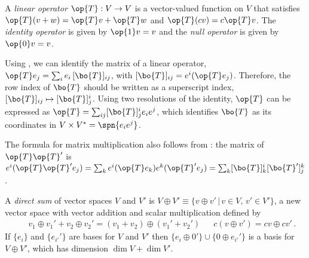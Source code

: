 \documentclass[11pt,fleqn]{article}
\numberwithin{equation}{section}
\begin{document}
\begin{dfn}
A \textit{linear operator} $\op{T}:V\rightarrow V$ is a vector-valued function on $V$ that satisfies $\op{T}(v+w)=\op{T}v + \op{T}w$ and $\op{T}(cv)=c\op{T}v$.
The \textit{identity operator} is given by $\op{1}v=v$ and the \textit{null operator} is given by $\op{0}v=v$.
\end{dfn}

\begin{prop}\label{resolution-of-the-identity}
\end{prop}

\begin{rmk}
Using , we can identify the matrix of a linear operator, $\op{T}e_j=\sum_ie_i\,[\bo{T}]_{ij}$, with $[\bo{T}]_{ij}=e^i(\op{T}e_j)$.
Therefore, the row index of $\bo{T}$ should be written as a superscript index, $[\bo{T}]_{ij}\mapsto[\bo{T}]^i_j$.
Using two resolutions of the identity, $\op{T}$ can be expressed as $\op{T}=\sum_{ij}[\bo{T}]_j^ie_ie^j$, which identifies $\bo{T}$ as its coordinates in $V\times V^*=\spn\{e_ie^j\}$.
\end{rmk}

\begin{rmk}
The formula for matrix multiplication also follows from :
the matrix of $\op{T}\op{T}'$ is $e^i(\op{T}\op{T}'e_j)=\sum_ke^i(\op{T}e_k)e^k(\op{T}'e_j)=\sum_k[\bo{T}]^i_k[\bo{T}']^k_j$.
\end{rmk}

\begin{dfn}\label{direct-sum-v-oplus-v'}
A \textit{direct sum} of vector spaces $V$ and $V'$ is $V\oplus V'\equiv\{v\oplus v'\,|\,v\in V,\,v'\in V'\}$, a new vector space with vector addition and scalar multiplication defined by
\begin{align}
&&
  v_1\oplus v_1'
+
  v_2\oplus v_2'
=
  (v_1 + v_2)
\oplus
  (v_1' + v_2')
&&
  c(v\oplus v')
=
  cv\oplus cv'\,.
\end{align}
If $\{e_i\}$ and $\{e_{i'}'\}$ are bases for $V$ and $V'$ then $\{e_i\oplus0'\}\cup\{0\oplus e_{i'}'\}$ is a basis for $V\oplus V'$, which has dimension $\dim V+\dim V'$.
\end{dfn}
\end{document}
